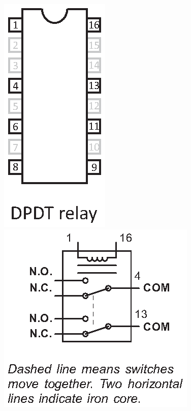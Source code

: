 \begin{enumerate}[wide]
\begin{center}
\hspace{0.3in}
\includegraphics[scale=0.7]{relays/relay_pinout.eps}
\hspace{-0.1in}
{\includegraphics{relays/relay_diagram2.eps}}
\end{center}


\end{enumerate}
